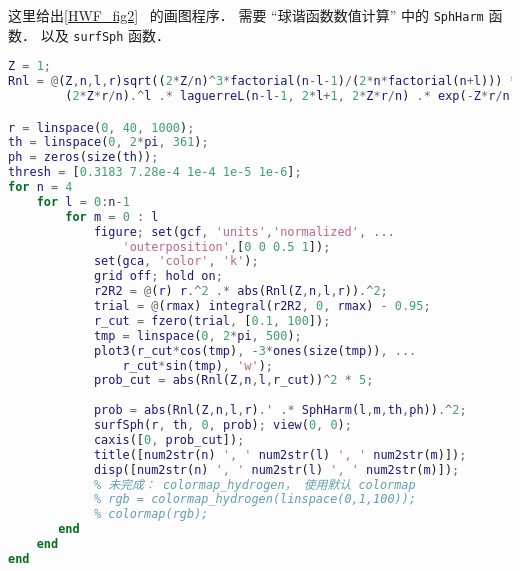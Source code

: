 
\begin{issues}
\issueDraft
\end{issues}


这里给出\autoref{HWF_fig2}~ 的画图程序． 需要 “球谐函数数值计算” 中的 \verb|SphHarm| 函数． 以及 \verb|surfSph| 函数．

\begin{lstlisting}[language=matlab]
Z = 1;
Rnl = @(Z,n,l,r)sqrt((2*Z/n)^3*factorial(n-l-1)/(2*n*factorial(n+l))) *...
        (2*Z*r/n).^l .* laguerreL(n-l-1, 2*l+1, 2*Z*r/n) .* exp(-Z*r/n);

r = linspace(0, 40, 1000);
th = linspace(0, 2*pi, 361);
ph = zeros(size(th));
thresh = [0.3183 7.28e-4 1e-4 1e-5 1e-6];
for n = 4
    for l = 0:n-1
        for m = 0 : l
            figure; set(gcf, 'units','normalized', ...
                'outerposition',[0 0 0.5 1]);
            set(gca, 'color', 'k');
            grid off; hold on;
            r2R2 = @(r) r.^2 .* abs(Rnl(Z,n,l,r)).^2;
            trial = @(rmax) integral(r2R2, 0, rmax) - 0.95;
            r_cut = fzero(trial, [0.1, 100]);
            tmp = linspace(0, 2*pi, 500);
            plot3(r_cut*cos(tmp), -3*ones(size(tmp)), ...
                r_cut*sin(tmp), 'w');
            prob_cut = abs(Rnl(Z,n,l,r_cut))^2 * 5;
            
            prob = abs(Rnl(Z,n,l,r).' .* SphHarm(l,m,th,ph)).^2;
            surfSph(r, th, 0, prob); view(0, 0);
            caxis([0, prob_cut]);
            title([num2str(n) ', ' num2str(l) ', ' num2str(m)]);
            disp([num2str(n) ', ' num2str(l) ', ' num2str(m)]);
            % 未完成： colormap_hydrogen， 使用默认 colormap
            % rgb = colormap_hydrogen(linspace(0,1,100));
            % colormap(rgb);
       end
    end
end
\end{lstlisting}
